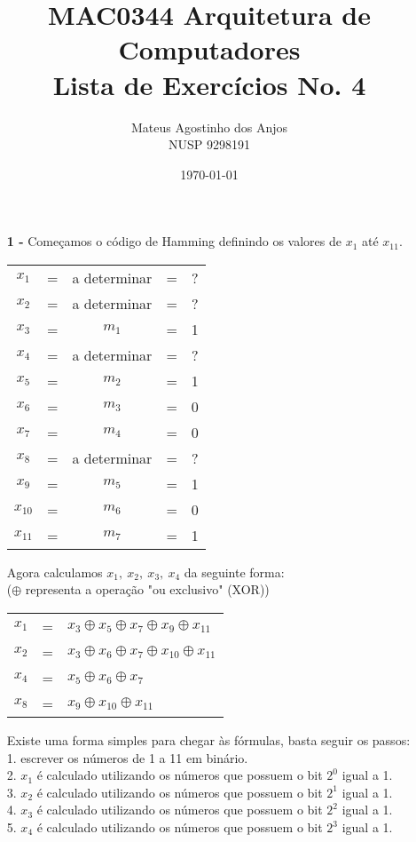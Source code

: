 \documentclass[12pt]{article}
\title{MAC0344 Arquitetura de Computadores\\
Lista de Exercícios No. 4
}
\author{Mateus Agostinho dos Anjos\\NUSP 9298191}
\date{\today}
\begin{document}
	\maketitle
	\begin{itemize}
		\item[\textbf{1 -}]
			\hfill\newline
			Começamos o código de Hamming definindo os valores de $x_1$ até $x_{11}$.
			\begin{center}
				\begin{tabular}{ccccc}
					$x_1$ & = & a determinar & = & ?\\
					$x_2$ & = & a determinar& = & ?\\
					$x_3$ & = & $m_1$ & = & 1 \\
					$x_4$ & = & a determinar & = & ?\\
					$x_5$ & = & $m_2$ & = & 1\\
					$x_6$ & = & $m_3$ & = & 0\\
					$x_7$ & = & $m_4$ & = & 0\\
					$x_8$ & = & a determinar & = & ?\\
					$x_9$ & = & $m_5$ & = & 1\\
					$x_{10}$ & = & $m_6$ & = & 0\\
					$x_{11}$ & = & $m_7$ & =& 1\\
				\end{tabular}
			\end{center}
			Agora calculamos $x_1, \ x_2, \ x_3, \ x_4$ da seguinte forma:\\
			($\oplus$ representa a operação "ou exclusivo" (XOR))
			\begin{center}
				\begin{tabular}{ccl}
					$x_1$ & = & $x_3 \oplus x_5 \oplus x_7 \oplus x_9 \oplus x_{11}$\\
					$x_2$ & = & $x_3 \oplus x_6 \oplus x_7 \oplus x_{10} \oplus x_{11}$\\
					$x_4$ & = & $x_5 \oplus x_6 \oplus x_7$\\
					$x_8$ & = & $x_9 \oplus x_{10} \oplus x_{11}$\\
				\end{tabular}
			\end{center}
			\newpage
			Existe uma forma simples para chegar às fórmulas, basta seguir os passos:\\
			1. escrever os números de 1 a 11 em binário.\\
			2. $x_1$ é calculado utilizando os números que possuem o bit $2^0$ igual a 1.\\
			3. $x_2$ é calculado utilizando os números que possuem o bit $2^1$ igual a 1.\\
			4. $x_3$ é calculado utilizando os números que possuem o bit $2^2$ igual a 1.\\
			5. $x_4$ é calculado utilizando os números que possuem o bit $2^3$ igual a 1.\\
			

\end{itemize}
\end{document}
